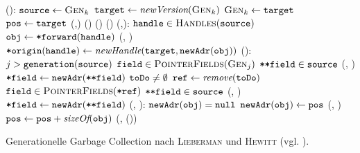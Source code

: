 \begin{algorithm}[h!]
\begin{algorithmic}[1]
	\State {}():
	\State \quad $\texttt{source} \gets \textsc{Gen}_k$
	\State \quad $\texttt{target} \gets \textit{newVersion}(\textsc{Gen}_k)$		
	\State \quad $\textsc{Gen}_k \gets \texttt{target}$
	\State \quad $\texttt{pos} \gets \texttt{target}$
	\State \quad {}(,)		
	\State \quad {}()		
	\State \quad {}()
	\State \quad {}()		
	\Statex
	\State {}(,):
	\State \quad \FOREACH $\texttt{handle} \in \textsc{Handles}(\texttt{source})$		
	\State \quad \quad $\texttt{obj} \gets \texttt{*forward}(\texttt{handle})$
	\State \quad \quad {}(, )
	\State \quad \quad $\texttt{*origin}(\texttt{handle}) \gets \textit{newHandle}(\texttt{target}, \texttt{newAdr}(\texttt{obj}))$
	\Statex
	\State {}():
	\State \quad \FOREACH $j > \texttt{generation}(\texttt{source})$		
	\State \quad \quad \FOREACH $\texttt{field} \in \textsc{PointerFields}(\textsc{Gen}_j)$	
	\State \quad \quad \quad \IF $\texttt{**field} \in \texttt{source}$
	\State \quad \quad \quad \quad {}(, )
	\State \quad \quad \quad \quad $\texttt{*field} \gets \texttt{newAdr}(\texttt{**field})$
	\State \quad \WHILE $\texttt{toDo} \neq \emptyset$
	\State \quad \quad $\texttt{ref} \gets \textit{remove}(\texttt{toDo})$
	\State \quad \quad \FOREACH $\texttt{field} \in \textsc{PointerFields}(\texttt{*ref})$	
	\State \quad \quad \quad \IF $\texttt{**field} \in \texttt{source}$
	\State \quad \quad \quad \quad {}(, )
	\State \quad \quad \quad \quad $\texttt{*field} \gets \texttt{newAdr}(\texttt{**field})$
	\Statex
	\State {}(, ):
	\State \quad \IF $\texttt{newAdr}(\texttt{obj}) = \texttt{null}$		
	\State \quad \quad $\texttt{newAdr}(\texttt{obj}) \gets \texttt{pos}$
	\State \quad \quad {}(, )
	\State \quad \quad $\texttt{pos} \gets \texttt{pos} + \textit{sizeOf}(\texttt{obj})$
	\State \quad \quad {}(, ())
\end{algorithmic}
\caption[Generationelle Garbage Collection nach \textsc{Lieberman} und \textsc{Hewitt}]{Generationelle Garbage Collection nach \textsc{Lieberman} und \textsc{Hewitt} (vgl. \cite[S. 421ff]{lieberman1983}).}
\label{algo:lieberman}
\end{algorithm}

